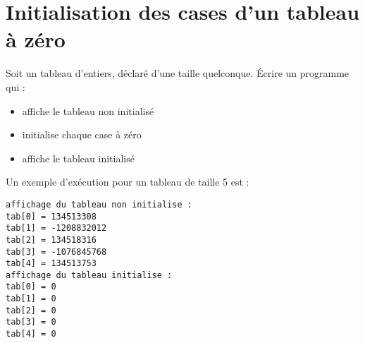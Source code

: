 \section{Initialisation des cases d'un tableau à zéro}

Soit un tableau d'entiers, déclaré d'une taille quelconque. Écrire un programme qui :
\begin{itemize}
\item affiche le tableau non initialisé
\item initialise chaque case à zéro
\item affiche le tableau initialisé
\end{itemize}

Un exemple d'exécution pour un tableau de taille 5 est :
\begin{small}
\begin{verbatim}
affichage du tableau non initialise :
tab[0] = 134513308
tab[1] = -1208832012
tab[2] = 134518316
tab[3] = -1076845768
tab[4] = 134513753
affichage du tableau initialise :
tab[0] = 0
tab[1] = 0
tab[2] = 0
tab[3] = 0
tab[4] = 0
\end{verbatim}
\end{small}

